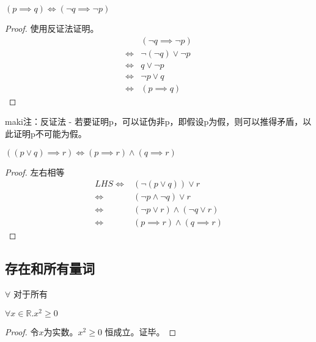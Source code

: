 \begin{theorem}
    $(p \implies q) \iff (\neg q \implies \neg p)$
\end{theorem}


\begin{proof}
    使用反证法证明。
\begin{equation}
    \begin{split}
        & (\neg q \implies \neg p) \\
        \iff & \neg (\neg q) \vee \neg p \\
        \iff & q \vee \neg p \\
        \iff & \neg p \vee q \\
        \iff & (p \implies q)
    \end{split}
\end{equation}
\end{proof}

maki注：反证法 - 若要证明p，可以证伪非p，即假设p为假，则可以推得矛盾，以此证明p不可能为假。

\begin{theorem}
    $((p \vee q) \implies r) \iff (p \implies r) \wedge (q \implies r)$
\end{theorem}

\begin{proof}
左右相等
\begin{equation}
    \begin{split}
        LHS \iff & (\neg (p \vee q)) \vee r \\
        \iff & (\neg p \wedge \neg q) \vee r \\
        \iff & (\neg p \vee r) \wedge (\neg q \vee r) \\
        \iff & (p \implies r) \wedge (q \implies r)
    \end{split}
\end{equation}
\end{proof}

\subsection{存在和所有量词}

$\forall$ 对于所有

\begin{example}
    $\forall x \in \mathbb{R}. x^2 \ge 0$
\end{example}

\begin{proof}
令$x$为实数。$x^2 \ge 0$ 恒成立。证毕。
\end{proof}


